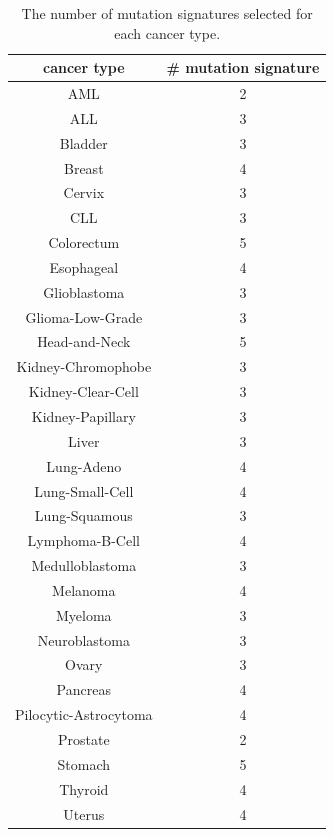 \documentclass{article}
\begin{document}
% 
%
%
%
%




\clearpage


\begin{table}
\caption{The number of mutation signatures selected for each cancer type.
}
\begin{center}
\begin{tabular}{|c|c|} \hline
cancer type & \# mutation signature \\ \hline
AML & 2 \\ \hline
ALL & 3 \\ \hline
Bladder & 3 \\ \hline
Breast & 4 \\ \hline
Cervix & 3 \\ \hline
CLL & 3 \\ \hline
Colorectum & 5 \\ \hline
Esophageal & 4 \\ \hline
Glioblastoma & 3 \\ \hline
Glioma-Low-Grade & 3 \\ \hline
Head-and-Neck & 5 \\ \hline
Kidney-Chromophobe & 3 \\ \hline
Kidney-Clear-Cell & 3 \\ \hline
Kidney-Papillary & 3 \\ \hline
Liver & 3 \\ \hline
Lung-Adeno & 4 \\ \hline
Lung-Small-Cell & 4 \\ \hline
Lung-Squamous & 3 \\ \hline
Lymphoma-B-Cell & 4 \\ \hline
Medulloblastoma & 3 \\ \hline
Melanoma & 4 \\ \hline
Myeloma & 3 \\ \hline
Neuroblastoma & 3 \\ \hline
Ovary & 3 \\ \hline
Pancreas & 4 \\ \hline
Pilocytic-Astrocytoma & 4 \\ \hline
Prostate & 2 \\ \hline
Stomach & 5 \\ \hline
Thyroid & 4 \\ \hline
Uterus & 4 \\ \hline
\end{tabular}
\end{center}
\label{tab_rep}
\end{table}
\end{document}
